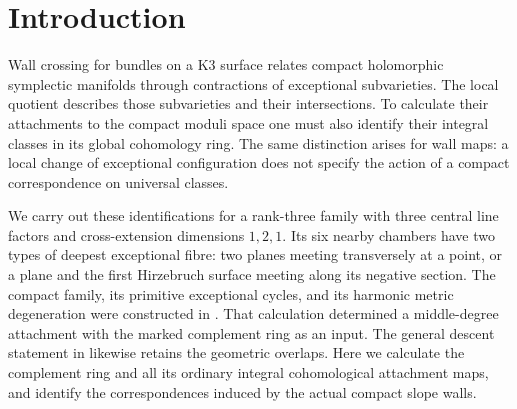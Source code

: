 \section{Introduction}

Wall crossing for bundles on a K3 surface relates compact holomorphic
symplectic manifolds through contractions of exceptional subvarieties.
The local quotient describes those subvarieties and their intersections.
To calculate their attachments to the compact moduli space one must also
identify their integral classes in its global cohomology ring. The same
distinction arises for wall maps: a local change of exceptional
configuration does not specify the action of a compact correspondence on
universal classes.

We carry out these identifications for a rank-three family with three
central line factors and cross-extension dimensions $1,2,1$.
Its six nearby chambers have two types of deepest exceptional fibre:
two planes meeting transversely at a point, or a plane and the first
Hirzebruch surface meeting along its negative section. The compact family,
its primitive exceptional cycles, and its harmonic metric degeneration
were constructed in \cite{wuebben17}. That calculation determined a
middle-degree attachment with the marked complement ring as an input.
The general descent statement in \cite{wuebben18} likewise retains the
geometric overlaps. Here we calculate the complement ring and all its
ordinary integral cohomological attachment maps, and identify the
correspondences induced by the actual compact slope walls.

